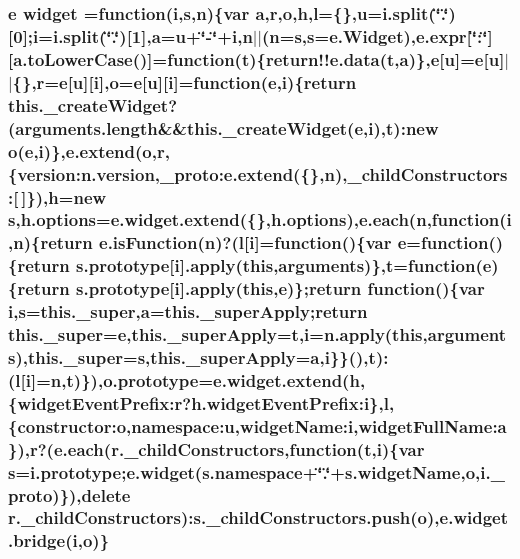 \hypertarget{root_2static_2root_2js_2jquery-ui_8custom_8min_8js_ada11821ba7802e380fc79337d4734d98}{
\subsubsection[{widget}]{ {\bf e} widget =function({\bf i},{\bf s},{\bf n})\{var {\bf a},{\bf r},{\bf o},{\bf h},{\bf l}=\{\},{\bf u}=i.\-split(\char`\"{}.\char`\"{})\mbox{[}0\mbox{]};{\bf i}=i.\-split(\char`\"{}.\char`\"{})\mbox{[}1\mbox{]},{\bf a}={\bf u}+\char`\"{}-\/\char`\"{}+{\bf i},{\bf n}$\vert$$\vert$({\bf n}={\bf s},{\bf s}={\bf e.\-Widget}),{\bf e.\-expr}\mbox{[}\char`\"{}\-:\char`\"{}\mbox{]}\mbox{[}a.\-to\-Lower\-Case()\mbox{]}=function({\bf t})\{{\bf return!!e.\-data}({\bf t},{\bf a})\},{\bf e}\mbox{[}{\bf u}\mbox{]}={\bf e}\mbox{[}{\bf u}\mbox{]}$\vert$$\vert$\{\},{\bf r}={\bf e}\mbox{[}{\bf u}\mbox{]}\mbox{[}{\bf i}\mbox{]},{\bf o}={\bf e}\mbox{[}{\bf u}\mbox{]}\mbox{[}{\bf i}\mbox{]}=function({\bf e},{\bf i})\{return this.\-\_\-create\-Widget?(arguments.\-length\&\&this.\-\_\-create\-Widget({\bf e},{\bf i}),{\bf t})\-:new {\bf o}({\bf e},{\bf i})\},{\bf e.\-extend}({\bf o},{\bf r},\{version\-:n.\-version,{\bf \-\_\-proto\-:e.\-extend}(\{\},{\bf n}),\-\_\-child\-Constructors\-:\mbox{[}$\,$\mbox{]}\}),{\bf h}=new {\bf s},h.\-options={\bf e.\-widget.\-extend}(\{\},h.\-options),{\bf e.\-each}({\bf n},function({\bf i},{\bf n})\{return e.\-is\-Function({\bf n})?({\bf l}\mbox{[}{\bf i}\mbox{]}=function()\{var {\bf e}=function()\{return {\bf s.\-prototype}\mbox{[}{\bf i}\mbox{]}.apply(this,arguments)\},{\bf t}=function({\bf e})\{return {\bf s.\-prototype}\mbox{[}{\bf i}\mbox{]}.apply(this,{\bf e})\};return function()\{var {\bf i},{\bf s}=this.\-\_\-super,{\bf a}=this.\-\_\-super\-Apply;return this.\-\_\-super={\bf e},this.\-\_\-super\-Apply={\bf t},{\bf i}=n.\-apply(this,arguments),this.\-\_\-super={\bf s},this.\-\_\-super\-Apply={\bf a},{\bf i}\}\}(),{\bf t})\-:({\bf l}\mbox{[}{\bf i}\mbox{]}={\bf n},{\bf t})\}),{\bf o.\-prototype}={\bf e.\-widget.\-extend}({\bf h},\{widget\-Event\-Prefix\-:r?h.\-widget\-Event\-Prefix\-:i\},{\bf l},\{constructor\-:o,namespace\-:u,widget\-Name\-:i,widget\-Full\-Name\-:a\}),{\bf r}?({\bf e.\-each}({\bf r.\-\_\-child\-Constructors},function({\bf t},{\bf i})\{var {\bf s}={\bf i.\-prototype};e.\-widget(s.\-namespace+\char`\"{}.\char`\"{}+s.\-widget\-Name,{\bf o},i.\-\_\-proto)\}),delete {\bf r.\-\_\-child\-Constructors})\-:s.\-\_\-child\-Constructors.\-push({\bf o}),{\bf e.\-widget.\-bridge}({\bf i},{\bf o})\}}}\label{root_2static_2root_2js_2jquery-ui_8custom_8min_8js_ada11821ba7802e380fc79337d4734d98}

